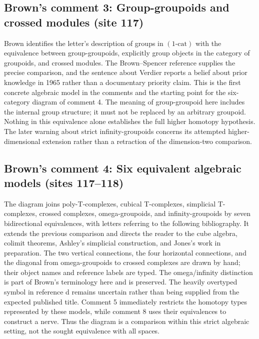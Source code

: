 \subsection*{Brown's comment 3: Group-groupoids and crossed modules (site 117)}
Brown identifies the letter's description of groups in $(1\text{-cat})$ with the equivalence between group-groupoids, explicitly group objects in the category of groupoids, and crossed modules. The Brown--Spencer reference supplies the precise comparison, and the sentence about Verdier reports a belief about prior knowledge in 1965 rather than a documentary priority claim. This is the first concrete algebraic model in the comments and the starting point for the six-category diagram of comment 4. The meaning of group-groupoid here includes the internal group structure; it must not be replaced by an arbitrary groupoid. Nothing in this equivalence alone establishes the full higher homotopy hypothesis. The later warning about strict infinity-groupoids concerns its attempted higher-dimensional extension rather than a retraction of the dimension-two comparison.

\subsection*{Brown's comment 4: Six equivalent algebraic models (sites 117--118)}
The diagram joins poly-T-complexes, cubical T-complexes, simplicial T-complexes, crossed complexes, omega-groupoids, and infinity-groupoids by seven bidirectional equivalences, with letters referring to the following bibliography. It extends the previous comparison and directs the reader to the cube algebra, colimit theorems, Ashley's simplicial construction, and Jones's work in preparation. The two vertical connections, the four horizontal connections, and the diagonal from omega-groupoids to crossed complexes are drawn by hand; their object names and reference labels are typed. The omega/infinity distinction is part of Brown's terminology here and is preserved. The heavily overtyped symbol in reference d remains uncertain rather than being supplied from the expected published title. Comment 5 immediately restricts the homotopy types represented by these models, while comment 8 uses their equivalences to construct a nerve. Thus the diagram is a comparison within this strict algebraic setting, not the sought equivalence with all spaces.

